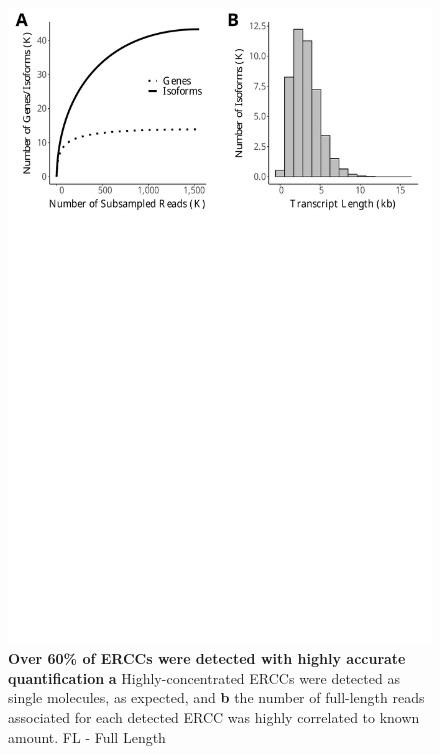 \begin{figure}[htp]
	\begin{center}
		\includegraphics[page=6,trim={0 25cm 0 0},clip,scale = 0.55]{Figures/IsoSeqWholeTranscriptome.pdf}
	\end{center}
	\captionsetup{width=0.95\textwidth}
	\caption[Detection of ERCC standards in Whole Transcriptome Iso-Seq]%
	{\textbf{Over 60\% of ERCCs were detected with highly accurate quantification} \textbf{a} Highly-concentrated ERCCs were detected as single molecules, as expected, and \textbf{b} the number of full-length reads associated for each detected ERCC was highly correlated to known amount. FL - Full Length}
	\label{fig:isoseq_whole_ercc}
\end{figure}


\newpage
